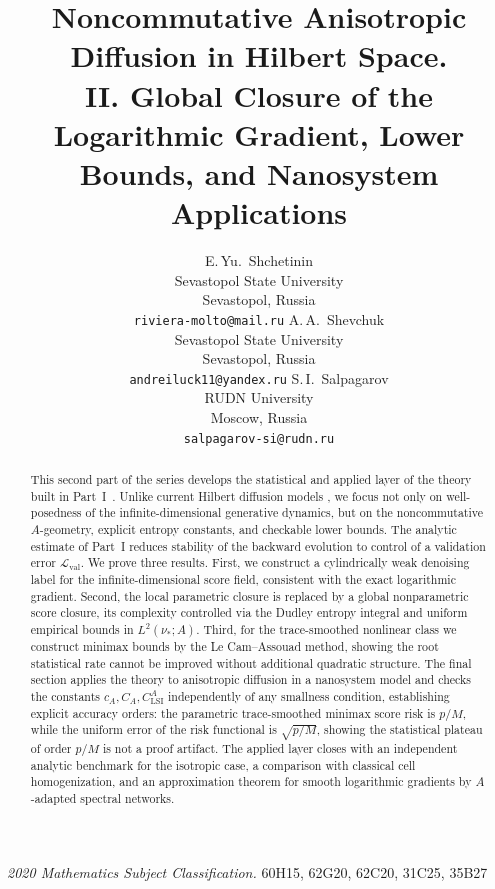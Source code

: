 \documentclass{article}
\title{Noncommutative Anisotropic Diffusion in Hilbert Space.\\
       II. Global Closure of the Logarithmic Gradient, Lower Bounds,
       and Nanosystem Applications}
\author{%
  E.\,Yu.~Shchetinin \\
  Sevastopol State University \\
  Sevastopol, Russia \\
  \texttt{riviera-molto@mail.ru}
  \And
  A.\,A.~Shevchuk \\
  Sevastopol State University \\
  Sevastopol, Russia \\
  \texttt{andreiluck11@yandex.ru}
  \AND
  S.\,I.~Salpagarov \\
  RUDN University \\
  Moscow, Russia \\
  \texttt{salpagarov-si@rudn.ru}
}
\newcommand{\Eval}{\mathcal L_{\mathrm{val}}}
\newcommand{\subjclass}[2][2020]{%
  \par\addvspace\medskipamount
  {\small\textit{2020 Mathematics Subject Classification.} #2\par}}
\begin{document}
\maketitle

\begin{abstract}
This second part of the series develops the statistical and applied layer of the theory built in Part~I~\cite{ShchetininPartI}. Unlike current Hilbert diffusion models \cite{LimYoon2023,Pidstrigach2024,Hagemann2025,FranzeseMichiardi2025}, we focus not only on well-posedness of the infinite-dimensional generative dynamics, but on the noncommutative \(A\)-geometry, explicit entropy constants, and checkable lower bounds. The analytic estimate of Part~I reduces stability of the backward evolution to control of a validation error \(\Eval\). We prove three results. First, we construct a cylindrically weak denoising label for the infinite-dimensional score field, consistent with the exact logarithmic gradient. Second, the local parametric closure is replaced by a global nonparametric score closure, its complexity controlled via the Dudley entropy integral and uniform empirical bounds in \(L^2(\nu_*;A)\). Third, for the trace-smoothed nonlinear class we construct minimax bounds by the Le Cam--Assouad method, showing the root statistical rate cannot be improved without additional quadratic structure. The final section applies the theory to anisotropic diffusion in a nanosystem model and checks the constants \(c_A,C_A,C_{\mathrm{LSI}}^A\) independently of any smallness condition, establishing explicit accuracy orders: the parametric trace-smoothed minimax score risk is \(p/M\), while the uniform error of the risk functional is \(\sqrt{p/M}\), showing the statistical plateau of order \(p/M\) is not a proof artifact. The applied layer closes with an independent analytic benchmark for the isotropic case, a comparison with classical cell homogenization, and an approximation theorem for smooth logarithmic gradients by \(A\)-adapted spectral networks.
\end{abstract}


\subjclass[2020]{60H15, 62G20, 62C20, 31C25, 35B27}
\end{document}

